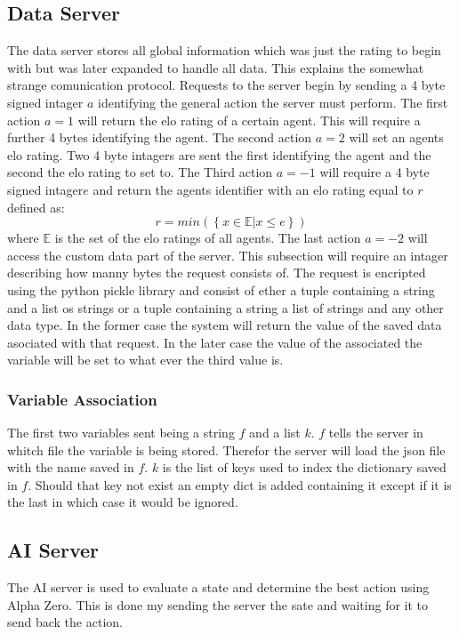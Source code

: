 \documentclass[12pt]{article}
\begin{document}
\subsection{Data Server}
The data server stores all global information which was just the rating to begin with but was later expanded to handle all data. This explains the somewhat strange comunication protocol. Requests to the server begin by sending a 4 byte signed intager \(a\) identifying the general action the server must perform. The first action \(a=1\) will return the elo rating of a certain agent.
This will require a further 4 bytes identifying the agent. The second action \(a=2\) will set an agents elo rating. Two 4 byte intagers are sent the first identifying the agent and the second the elo rating to set to. The Third action \(a=-1\) will require a 4 byte signed intager\(e\) and return the agents identifier with an elo rating equal to \(r\) defined as:
\begin{equation}
r = min(\left\{x \in\mathbb E | x \leq e \right\})
\end{equation}
where \(\mathbb E\) is the set of the elo ratings of all agents. The last action \(a=-2\) will access the custom data part of the server. This subsection will require an intager describing how manny bytes the request consists of. The request is encripted using the python pickle library and consist of ether a tuple containing a string and a list os strings or a tuple containing a string a list of strings and any other data type. In the former case the system will return the value of the saved data asociated with that request. In the later case the value of the associated the variable will be set to what ever the third value is.
\subsubsection{Variable Association}
The first two variables sent being a string \(f\) and a list \(k\). \(f\) tells the server in whitch file the variable is being stored. Therefor the server will load the json file with the name saved in \(f\). \(k\) is the list of keys used to index the dictionary saved in \(f\). Should that key not exist an empty dict is added containing it except if it is the last in which case it would be ignored.

\subsection{AI Server}
The AI server is used to evaluate a state and determine the best action using Alpha Zero. This is done my sending the server the sate and waiting for it to send back the action.
\end{document}
